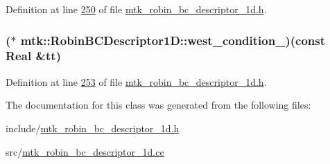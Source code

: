 Definition at line \hyperlink{mtk__robin__bc__descriptor__1d_8h_source_l00250}{250} of file \hyperlink{mtk__robin__bc__descriptor__1d_8h_source}{mtk\+\_\+robin\+\_\+bc\+\_\+descriptor\+\_\+1d.\+h}.

\hypertarget{classmtk_1_1RobinBCDescriptor1D_ab4e2dd2c68d33d8fc82ba697d515ebd2}{
\subsubsection[{west\+\_\+condition\+\_\+}]{($\ast$ mtk\+::\+Robin\+B\+C\+Descriptor1\+D\+::west\+\_\+condition\+\_\+)(const {\bf Real} \&tt)\hspace{0.3cm}{\ttfamily [private]}}}\label{classmtk_1_1RobinBCDescriptor1D_ab4e2dd2c68d33d8fc82ba697d515ebd2}


Definition at line \hyperlink{mtk__robin__bc__descriptor__1d_8h_source_l00253}{253} of file \hyperlink{mtk__robin__bc__descriptor__1d_8h_source}{mtk\+\_\+robin\+\_\+bc\+\_\+descriptor\+\_\+1d.\+h}.



The documentation for this class was generated from the following files\+:\begin{DoxyCompactItemize}
\item 
include/\hyperlink{mtk__robin__bc__descriptor__1d_8h}{mtk\+\_\+robin\+\_\+bc\+\_\+descriptor\+\_\+1d.\+h}\item 
src/\hyperlink{mtk__robin__bc__descriptor__1d_8cc}{mtk\+\_\+robin\+\_\+bc\+\_\+descriptor\+\_\+1d.\+cc}\end{DoxyCompactItemize}
